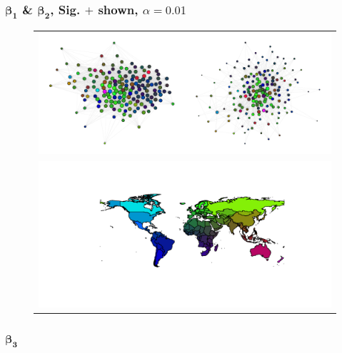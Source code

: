 \documentclass[10pt, compress]{beamer}
\begin{document}
\frame
{
\frametitle{$\boldsymbol{\beta_{1}}$ \& $\boldsymbol{\beta_{2}}$, Sig. $+$ shown, $\alpha = 0.01$}
  \vspace{-15mm}
  \begin{figure}[ht]
  \centering
    \begin{tabular}{c}
      \includegraphics[width=1\textwidth]{net.pdf} \\
      \includegraphics[width=.9\textwidth]{map.pdf}
    \end{tabular}
  \end{figure}
}

\frame
{
\frametitle{$\boldsymbol{\beta_{3}}$}
  \centering
  \resizebox{1\textwidth}{!}{}  
}
\end{document}
